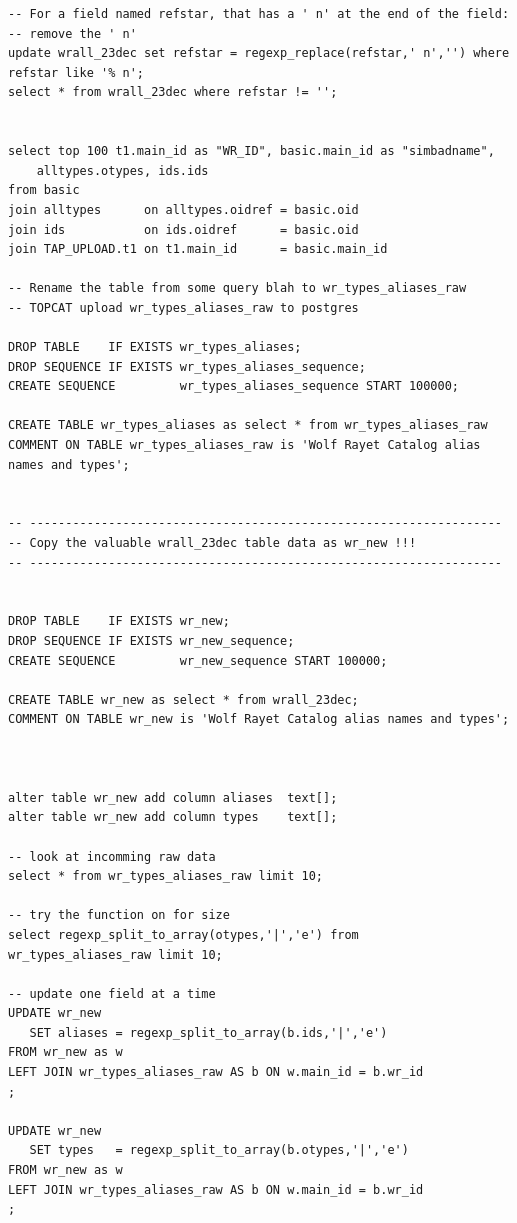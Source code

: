 \begingroup \fontsize{10pt}{10pt}
\selectfont
\begin{verbatim} 
-- For a field named refstar, that has a ' n' at the end of the field:
-- remove the ' n'
update wrall_23dec set refstar = regexp_replace(refstar,' n','') where refstar like '% n';
select * from wrall_23dec where refstar != '';


select top 100 t1.main_id as "WR_ID", basic.main_id as "simbadname", 
    alltypes.otypes, ids.ids
from basic
join alltypes      on alltypes.oidref = basic.oid
join ids           on ids.oidref      = basic.oid
join TAP_UPLOAD.t1 on t1.main_id      = basic.main_id

-- Rename the table from some query blah to wr_types_aliases_raw
-- TOPCAT upload wr_types_aliases_raw to postgres

DROP TABLE    IF EXISTS wr_types_aliases;
DROP SEQUENCE IF EXISTS wr_types_aliases_sequence;
CREATE SEQUENCE         wr_types_aliases_sequence START 100000;

CREATE TABLE wr_types_aliases as select * from wr_types_aliases_raw
COMMENT ON TABLE wr_types_aliases_raw is 'Wolf Rayet Catalog alias names and types';


-- ------------------------------------------------------------------
-- Copy the valuable wrall_23dec table data as wr_new !!!
-- ------------------------------------------------------------------


DROP TABLE    IF EXISTS wr_new;
DROP SEQUENCE IF EXISTS wr_new_sequence;
CREATE SEQUENCE         wr_new_sequence START 100000;

CREATE TABLE wr_new as select * from wrall_23dec;
COMMENT ON TABLE wr_new is 'Wolf Rayet Catalog alias names and types';



alter table wr_new add column aliases  text[];
alter table wr_new add column types    text[];

-- look at incomming raw data
select * from wr_types_aliases_raw limit 10;

-- try the function on for size
select regexp_split_to_array(otypes,'|','e') from  wr_types_aliases_raw limit 10;
 
-- update one field at a time
UPDATE wr_new
   SET aliases = regexp_split_to_array(b.ids,'|','e') 
FROM wr_new as w
LEFT JOIN wr_types_aliases_raw AS b ON w.main_id = b.wr_id
;

UPDATE wr_new
   SET types   = regexp_split_to_array(b.otypes,'|','e')
FROM wr_new as w
LEFT JOIN wr_types_aliases_raw AS b ON w.main_id = b.wr_id
;



\end{verbatim}
